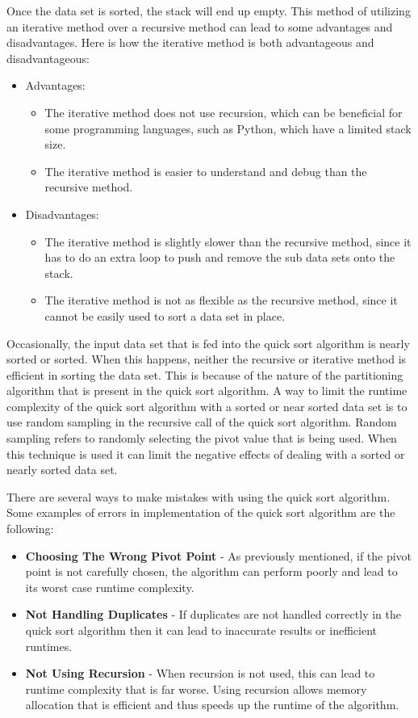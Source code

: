 \documentclass[a4paper,9pt]{article}
\begin{document}
\noindent Once the data set is sorted, the stack will end up empty. This method of utilizing an iterative method over a recursive method can lead to some advantages and disadvantages. Here is how the iterative method is both advantageous and disadvantageous:

\begin{itemize}
    \item Advantages:
    \begin{itemize}
        \item The iterative method does not use recursion, which can be beneficial for some programming languages, such as Python, which have a limited stack size.
        \item The iterative method is easier to understand and debug than the recursive method.
    \end{itemize}
    \item Disadvantages:
    \begin{itemize}
        \item The iterative method is slightly slower than the recursive method, since it has to do an extra loop to push and remove the sub data sets onto the stack.
        \item The iterative method is not as flexible as the recursive method, since it cannot be easily used to sort a data set in place.
    \end{itemize}
\end{itemize}

\noindent Occasionally, the input data set that is fed into the quick sort algorithm is nearly sorted or sorted. When this happens, neither the recursive or iterative method is efficient in sorting the data set. This is because of the nature of the partitioning algorithm that is present in the quick sort algorithm. A way to limit the runtime complexity
of the quick sort algorithm with a sorted or near sorted data set is to use random sampling in the recursive call of the quick sort algorithm. Random sampling refers to randomly selecting the pivot value that is being used. When this technique is used it can limit the negative effects of dealing with a sorted or nearly sorted data set.

There are several ways to make mistakes with using the quick sort algorithm. Some examples of errors in implementation of the quick sort algorithm are the following:

\begin{itemize}
    \item \textbf{Choosing The Wrong Pivot Point} - As previously mentioned, if the pivot point is not carefully chosen, the algorithm can perform poorly and lead to its worst case runtime complexity.
    \item \textbf{Not Handling Duplicates} - If duplicates are not handled correctly in the quick sort algorithm then it can lead to inaccurate results or inefficient runtimes.
    \item \textbf{Not Using Recursion} - When recursion is not used, this can lead to runtime complexity that is far worse. Using recursion allows memory allocation that is efficient and thus speeds up the runtime of the algorithm.
\end{itemize}
\end{document}
